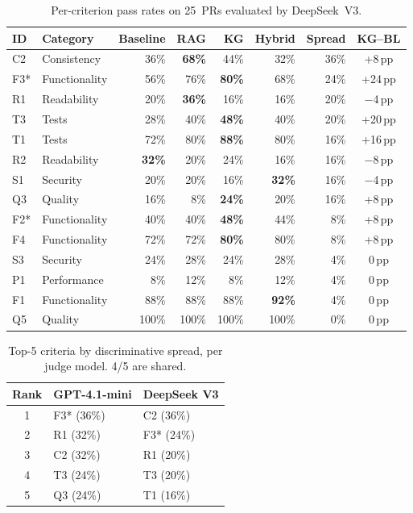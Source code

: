 \begin{table}[t]
\centering
\caption{Per-criterion pass rates on 25~PRs evaluated by DeepSeek~V3.}
\label{tab:per-criterion-deepseek}
\begin{tabular}{llrrrrrc}
\toprule
\textbf{ID} & \textbf{Category} & \textbf{Baseline} & \textbf{RAG} & \textbf{KG} & \textbf{Hybrid} & \textbf{Spread} & \textbf{KG--BL} \\
\midrule
C2  & Consistency   & 36\% & \textbf{68\%} & 44\% & 32\% & 36\% & +8\,pp \\
F3* & Functionality & 56\% & 76\% & \textbf{80\%} & 68\% & 24\% & +24\,pp \\
R1  & Readability   & 20\% & \textbf{36\%} & 16\% & 16\% & 20\% & $-$4\,pp \\
T3  & Tests         & 28\% & 40\% & \textbf{48\%} & 40\% & 20\% & +20\,pp \\
T1  & Tests         & 72\% & 80\% & \textbf{88\%} & 80\% & 16\% & +16\,pp \\
R2  & Readability   & \textbf{32\%} & 20\% & 24\% & 16\% & 16\% & $-$8\,pp \\
S1  & Security      & 20\% & 20\% & 16\% & \textbf{32\%} & 16\% & $-$4\,pp \\
Q3  & Quality       & 16\% & 8\% & \textbf{24\%} & 20\% & 16\% & +8\,pp \\
F2* & Functionality & 40\% & 40\% & \textbf{48\%} & 44\% & 8\% & +8\,pp \\
F4  & Functionality & 72\% & 72\% & \textbf{80\%} & 80\% & 8\% & +8\,pp \\
S3  & Security      & 24\% & 28\% & 24\% & 28\% & 4\% & 0\,pp \\
P1  & Performance   & 8\% & 12\% & 8\% & 12\% & 4\% & 0\,pp \\
F1  & Functionality & 88\% & 88\% & 88\% & \textbf{92\%} & 4\% & 0\,pp \\
Q5  & Quality       & 100\% & 100\% & 100\% & 100\% & 0\% & 0\,pp \\
\bottomrule
\end{tabular}
\end{table}



\begin{table}[t]
\centering
\caption{Top-5 criteria by discriminative spread, per judge model. 4/5 are shared.}
\label{tab:top5-spread}
\begin{tabular}{cll}
\toprule
\textbf{Rank} & \textbf{GPT-4.1-mini} & \textbf{DeepSeek V3} \\
\midrule
1 & F3* (36\%) & C2 (36\%) \\
2 & R1 (32\%)  & F3* (24\%) \\
3 & C2 (32\%)  & R1 (20\%) \\
4 & T3 (24\%)  & T3 (20\%) \\
5 & Q3 (24\%)  & T1 (16\%) \\
\bottomrule
\end{tabular}
\end{table}


